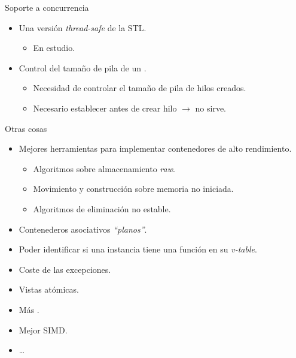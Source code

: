 \begin{frame}[t]{Soporte a concurrencia}
\begin{itemize}
  \item Una versión \emph{thread-safe} de la STL.
    \begin{itemize}
      \item En estudio.
    \end{itemize}
  \item Control del tamaño de pila de un .
    \begin{itemize}
      \item Necesidad de controlar el tamaño de pila de hilos creados.
      \item Necesario establecer \alert{antes} de crear hilo $\rightarrow$  no sirve.
    \end{itemize}
\end{itemize}
\end{frame}

\begin{frame}[t]{Otras cosas}
\begin{itemize}
  \item Mejores herramientas para implementar contenedores de alto rendimiento.
    \begin{itemize}
      \item Algoritmos sobre almacenamiento \emph{raw}.
      \item Movimiento y construcción sobre memoria no iniciada.
      \item Algoritmos de eliminación no estable.
    \end{itemize}
  \item Contenederos asociativos \emph{``planos''}.
  \item Poder identificar si una instancia tiene una función en su \emph{v-table}.
  \item Coste de las excepciones.
  \item Vistas atómicas.
  \item Más .
  \item Mejor SIMD.
  \item \ldots
\end{itemize}
\end{frame}
